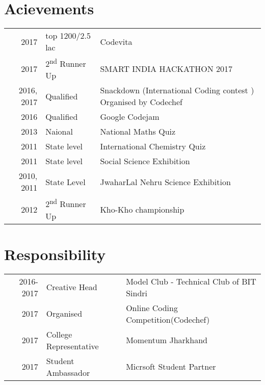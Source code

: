 \documentclass[a4paper]{deedy-resume} %
\begin{document}
\begin{minipage}[t]{0.66\textwidth}
\sectionspace %



\sectionspace %





\section{Acievements} 

\begin{tabular}{rll}
2017	 & top 1200/2.5 lac & Codevita \\
2017	 & 2\textsuperscript{nd} Runner Up &  SMART INDIA HACKATHON 2017\\
2016, 2017	 & Qualified & Snackdown (International Coding contest ) Organised by Codechef\\
2016	 & Qualified & Google Codejam\\
2013 & Naional & National Maths Quiz\\
2011 & State level& International Chemistry Quiz\\
2011 & State level & Social Science Exhibition \\
2010, 2011 & State Level & JwaharLal Nehru Science Exhibition\\
2012 & 2\textsuperscript{nd} Runner Up & Kho-Kho championship\\
\end{tabular}

\sectionspace %


\section{Responsibility} 

\begin{tabular}{rll}
2016-2017 & Creative Head & Model Club - Technical Club of BIT Sindri\\
2017 & Organised & Online Coding Competition(Codechef)\\
2017 & College Representative & Momentum Jharkhand\\
2017 & Student Ambassador & Micrsoft Student Partner\\
\end{tabular}

\sectionspace %


\end{minipage} %
\end{document}
